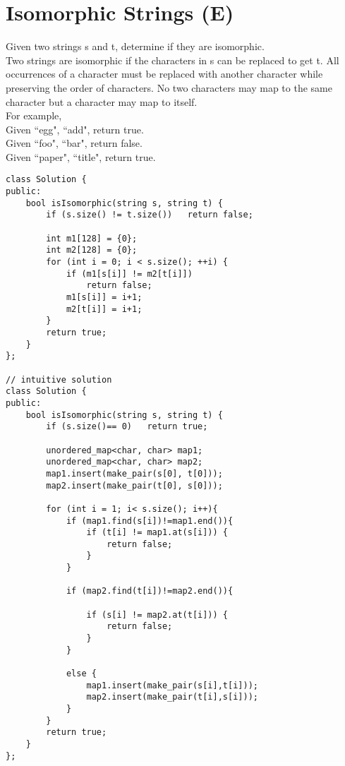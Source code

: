 \section{Isomorphic Strings (E)}
Given two strings s and t, determine if they are isomorphic. \\

Two strings are isomorphic if the characters in s can be replaced to get t. All occurrences of a character must be replaced with another character while preserving the order of characters. No two characters may map to the same character but a character may map to itself.\\

For example,\\
Given ``egg", ``add", return true.\\
Given ``foo", ``bar", return false.\\
Given ``paper", ``title", return true.\\

\begin{lstlisting}
class Solution {
public:
    bool isIsomorphic(string s, string t) {
        if (s.size() != t.size())   return false;
            
        int m1[128] = {0};
        int m2[128] = {0};
        for (int i = 0; i < s.size(); ++i) {
            if (m1[s[i]] != m2[t[i]])
                return false;
            m1[s[i]] = i+1;
            m2[t[i]] = i+1;
        }
        return true;
    }
};

// intuitive solution  
class Solution {
public:
    bool isIsomorphic(string s, string t) {
        if (s.size()== 0)   return true;
        
        unordered_map<char, char> map1;
        unordered_map<char, char> map2;
        map1.insert(make_pair(s[0], t[0]));
        map2.insert(make_pair(t[0], s[0]));
        
        for (int i = 1; i< s.size(); i++){
            if (map1.find(s[i])!=map1.end()){
                if (t[i] != map1.at(s[i])) {
                    return false;
                }
            }
            
            if (map2.find(t[i])!=map2.end()){
                
                if (s[i] != map2.at(t[i])) {
                    return false;
                }
            }
            
            else {
                map1.insert(make_pair(s[i],t[i]));
                map2.insert(make_pair(t[i],s[i]));
            }
        }
        return true;
    }
};
\end{lstlisting}


